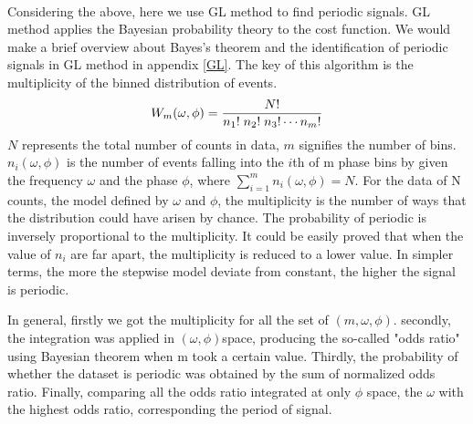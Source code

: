 \documentclass[twoside,twocolumn]{aastex63}
\begin{document}
\\
\indent
Considering the above, here we use GL method to find periodic signals. GL method applies the Bayesian probability theory to the cost function. We would make a brief overview about Bayes's theorem and the identification of periodic signals in GL method in appendix \ref{GL}. The key of this algorithm is the multiplicity of the binned distribution of events. 
\begin{equation}\label{multi}
W_m(\omega, \phi)={{N!}\over{n_1!\; n_2!\; n_3!\cdots {n_m}!}}
\end{equation}
$N$ represents the total number of counts in data, $m$ signifies the number of bins. $n_i(\omega, \phi)$ is the number of events falling into the $i$th of m phase bins by given the frequency $\omega$ and the phase $\phi$, where $\sum\limits_{i=1}^{m}n_i(\omega, \phi)=N$. For the data of N counts, the model defined by $\omega$ and $\phi$, the multiplicity is the number of ways that the distribution could have arisen by chance. The probability of periodic is inversely proportional to the multiplicity. It could be easily proved that when the value of $n_i$ are far apart, the multiplicity is reduced to a lower value. In simpler terms, the more the stepwise model deviate from constant, the higher the signal is periodic. 

In general, firstly we got the multiplicity for all the set of $(m,\omega, \phi)$. secondly, the integration was applied in $(\omega, \phi)$space, producing the so-called "odds ratio" using Bayesian theorem when m took a certain value. Thirdly, the probability of whether the dataset is periodic was obtained by the sum of normalized odds ratio. Finally, comparing all the odds ratio integrated at only $\phi$ space, the $\omega$ with the highest odds ratio, corresponding the period of signal.

\end{document}

